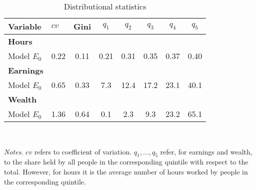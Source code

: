 \begin{table}[!htbp]
\centering
\caption{Distributional statistics}
\begin{tabular}{llcccccc}
\toprule
Variable & $cv$ & Gini & $q_1$ & $q_2$ & $q_3$ & $q_4$ & $q_5$ \\
\midrule
\textbf{Hours} &   &  &   &  &  &  &  \\
Model $E_0$ & 0.22 & 0.11 & 0.21 & 0.31 & 0.35 & 0.37 & 0.40 \\
\addlinespace
\textbf{Earnings} &   &  &   &  &  &  &  \\
Model $E_0$ & 0.65 & 0.33 & 7.3 & 12.4 & 17.2 & 23.1 & 40.1 \\
\addlinespace
\textbf{Wealth} &   &  &   &  &  &  &  \\
Model $E_0$ & 1.36 & 0.64 & 0.1 & 2.3 & 9.3 & 23.2 & 65.1 \\
\bottomrule
\end{tabular}
\\[3ex]
\raggedright\footnotesize{\textit{Notes.} $cv$ refers to coefficient of variation. $q_1, \dots, q_5$ refer, for earnings and wealth, to the share held by all people in the corresponding quintile with respect to the total. However, for hours it is the average number of hours worked by people in the corresponding quintile.}\\
\normalsize
\end{table}
